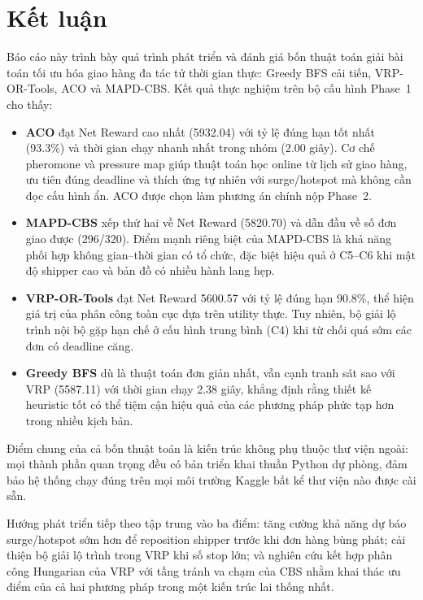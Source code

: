\documentclass[conference]{IEEEtran}
\begin{document}
\section{Kết luận}

Báo cáo này trình bày quá trình phát triển và đánh giá bốn thuật toán giải bài toán tối ưu hóa giao hàng đa tác tử thời gian thực: Greedy BFS cải tiến, VRP-OR-Tools, ACO và MAPD-CBS. Kết quả thực nghiệm trên bộ cấu hình Phase~1 cho thấy:

\begin{itemize}
    \item \textbf{ACO} đạt Net Reward cao nhất (5932.04) với tỷ lệ đúng hạn tốt nhất (93.3\%) và thời gian chạy nhanh nhất trong nhóm (2.00 giây). Cơ chế pheromone và pressure map giúp thuật toán học online từ lịch sử giao hàng, ưu tiên đúng deadline và thích ứng tự nhiên với surge/hotspot mà không cần đọc cấu hình ẩn. ACO được chọn làm phương án chính nộp Phase~2.

    \item \textbf{MAPD-CBS} xếp thứ hai về Net Reward (5820.70) và dẫn đầu về số đơn giao được (296/320). Điểm mạnh riêng biệt của MAPD-CBS là khả năng phối hợp không gian--thời gian có tổ chức, đặc biệt hiệu quả ở C5--C6 khi mật độ shipper cao và bản đồ có nhiều hành lang hẹp.

    \item \textbf{VRP-OR-Tools} đạt Net Reward 5600.57 với tỷ lệ đúng hạn 90.8\%, thể hiện giá trị của phân công toàn cục dựa trên utility thực. Tuy nhiên, bộ giải lộ trình nội bộ gặp hạn chế ở cấu hình trung bình (C4) khi từ chối quá sớm các đơn có deadline căng.

    \item \textbf{Greedy BFS} dù là thuật toán đơn giản nhất, vẫn cạnh tranh sát sao với VRP (5587.11) với thời gian chạy 2.38 giây, khẳng định rằng thiết kế heuristic tốt có thể tiệm cận hiệu quả của các phương pháp phức tạp hơn trong nhiều kịch bản.
\end{itemize}

Điểm chung của cả bốn thuật toán là kiến trúc không phụ thuộc thư viện ngoài: mọi thành phần quan trọng đều có bản triển khai thuần Python dự phòng, đảm bảo hệ thống chạy đúng trên mọi môi trường Kaggle bất kể thư viện nào được cài sẵn.

Hướng phát triển tiếp theo tập trung vào ba điểm: tăng cường khả năng dự báo surge/hotspot sớm hơn để reposition shipper trước khi đơn hàng bùng phát; cải thiện bộ giải lộ trình trong VRP khi số stop lớn; và nghiên cứu kết hợp phân công Hungarian của VRP với tầng tránh va chạm của CBS nhằm khai thác ưu điểm của cả hai phương pháp trong một kiến trúc lai thống nhất.
\end{document}
